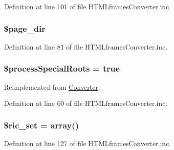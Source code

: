 \-Definition at line 101 of file \-H\-T\-M\-Lframes\-Converter.\-inc.

\hypertarget{class_h_t_m_lframes_converter_ab554c658003c5e2653580ba881cd50eb}{
\subsubsection[{\$page\-\_\-dir}]{\setlength{\rightskip}{0pt plus 5cm}\$page\-\_\-dir}}\label{class_h_t_m_lframes_converter_ab554c658003c5e2653580ba881cd50eb}


\-Definition at line 81 of file \-H\-T\-M\-Lframes\-Converter.\-inc.

\hypertarget{class_h_t_m_lframes_converter_adcae2bdef17468fc5bf2f15981da497e}{
\subsubsection[{\$process\-Special\-Roots}]{\setlength{\rightskip}{0pt plus 5cm}\$process\-Special\-Roots = true}}\label{class_h_t_m_lframes_converter_adcae2bdef17468fc5bf2f15981da497e}


\-Reimplemented from \hyperlink{class_converter_adcae2bdef17468fc5bf2f15981da497e}{\-Converter}.



\-Definition at line 60 of file \-H\-T\-M\-Lframes\-Converter.\-inc.

\hypertarget{class_h_t_m_lframes_converter_a84e3c5e32f1d02114c9d126d5864d06b}{
\subsubsection[{\$ric\-\_\-set}]{\setlength{\rightskip}{0pt plus 5cm}\$ric\-\_\-set = array()}}\label{class_h_t_m_lframes_converter_a84e3c5e32f1d02114c9d126d5864d06b}


\-Definition at line 127 of file \-H\-T\-M\-Lframes\-Converter.\-inc.

